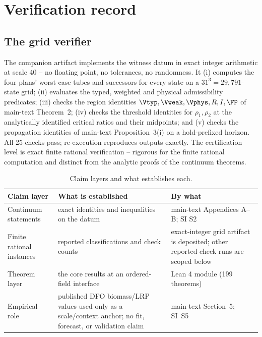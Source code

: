\section{Verification record}\label{si:verification}

\subsection{The grid verifier}

The companion artifact implements the witness datum in exact integer arithmetic at scale 40 -- no floating point, no tolerances, no randomness. It (i) computes the four plans' worst-case tubes and successors for every state on a $31^3=29{,}791$-state grid; (ii) evaluates the typed, weighted and physical admissibility predicates; (iii) checks the region identities $\Vtyp,\Vweak,\Vphys,R,I,\FP$ of main-text Theorem~2; (iv) checks the threshold identities for $\rho_1,\rho_2$ at the analytically identified critical ratios and their midpoints; and (v) checks the propagation identities of main-text Proposition~3(i) on a hold-prefixed horizon. All 25 checks pass; re-execution reproduces outputs exactly. The certification level is exact finite rational verification -- rigorous for the finite rational computation and distinct from the analytic proofs of the continuum theorems.

\begin{table}[!htbp]
\centering\small
\caption{Claim layers and what establishes each.}
\begin{tabularx}{\textwidth}{@{}>{\raggedright\arraybackslash}p{}XX@{}}
\toprule
Claim layer & What is established & By what \\
\midrule
Continuum statements & exact identities and inequalities on the datum & main-text Appendices A--B; SI S2 \\
Finite rational instances & reported classifications and check counts & exact-integer grid artifact is deposited; other reported check runs are scoped below \\
Theorem layer & the core results at an ordered-field interface & Lean 4 module (199 theorems) \\
Empirical role & published DFO biomass/LRP values used only as a scale/context anchor; no fit, forecast, or validation claim & main-text Section~5; SI~S5 \\
\bottomrule
\end{tabularx}
\end{table}

